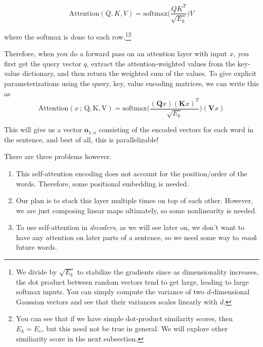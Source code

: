 \begin{definition}
        \begin{equation} 
          \mathrm{Attention}(Q, K, V) = \mathrm{softmax} \bigg( \frac{Q K^T}{\sqrt{E_k}} \bigg) V
        \end{equation}

        where the softmax is done to each row.\footnote{We divide by $\sqrt{E_k}$ to stabilize the gradients since as dimensionality increases, the dot product between random vectors tend to get large, leading to large softmax inputs. You can simply compute the variance of two $d$-dimensional Gaussian vectors and see that their variances scales linearly with $d$. }\footnote{You can see that if we have simple dot-product similarity scores, then $E_k = E_v$, but this need not be true in general. We will explore other similiarity score in the next subsection. } 

        Therefore, when you do a forward pass on an attention layer with input $x$, you first get the query vector $q$, extract the attention-weighted values from the key-value dictionary, and then return the weighted sum of the values. To give explicit parameterizations using the query, key, value encoding matrices, we can write this as 
        \begin{equation} 
          \mathrm{Attention}(x \,;\, \mathrm{Q}, \mathrm{K}, \mathrm{V}) = \mathrm{softmax} \bigg( \frac{(\mathbf{Q}x)(\mathbf{K} x)^T}{\sqrt{E_k}} \bigg) (\mathbf{V} x)
        \end{equation}

        This will give us a vector $\mathbf{o}_{1:n}$ consisting of the encoded vectors for each word in the sentence, and best of all, this is parallelizable! 
      \end{definition}

      There are three problems however. 
      \begin{enumerate}
        \item This self-attention encoding does not account for the position/order of the words. Therefore, some positional embedding is needed. 
        \item Our plan is to stack this layer multiple times on top of each other. However, we are just composing linear maps ultimately, so some nonlinearity is needed. 
        \item To use self-attention in \textit{decoders}, as we will see later on, we don't want to have any attention on later parts of a sentence, so we need some way to \textit{mask} future words. 
      \end{enumerate}

